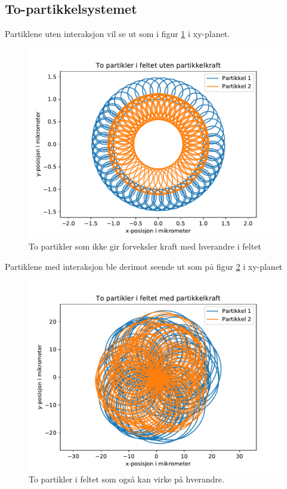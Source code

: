 \documentclass[reprint,english,notitlepage]{revtex4-1}  %
\begin{document}
\subsection*{To-partikkelsystemet}
Partiklene uten interaksjon vil se ut som i figur \ref{r2noint} i xy-planet.
\begin{figure}[H]
	\label{r2noint}
	\centering 
	\includegraphics[scale=0.4]{../pythonplots/xypartnoint.pdf}
	\caption{To partikler som ikke gir forveksler kraft med hverandre i feltet}
\end{figure}
Partiklene med interaksjon ble derimot seende ut som på figur \ref{r2int} i xy-planet
\begin{figure}[H]
	\label{r2int}
	\centering 
	\includegraphics[scale=0.4]{../pythonplots/xypartint.pdf}
	\caption{To partikler i feltet som også kan virke på hverandre.}
\end{figure}
\end{document}
